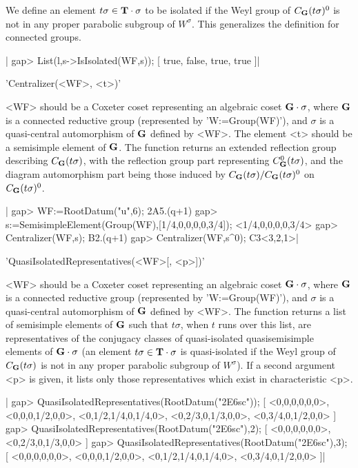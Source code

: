 We  define an element $t\sigma\in{\bf T}\cdot\sigma$ to be isolated if the Weyl
group  of $C_{\bf G}(t\sigma)^0$  is not  in any  proper parabolic  subgroup of
$W^\sigma$. This generalizes the definition for connected groups.

|    gap> List(l,s->IsIsolated(WF,s));
    [ true, false, true, true ]|


'Centralizer(<WF>, <t>)'

<WF>   should  be   a  Coxeter   coset  representing   an  algebraic  coset
${\bf G}\cdot\sigma$,  where ${\bf G}$ is a  connected reductive group (represented
by  'W:=Group(WF)'), and $\sigma$ is a quasi-central automorphism of ${\bf G}$
defined  by <WF>. The element <t> should  be a semisimple element of ${\bf G}$.
The    function   returns   an   extended   reflection   group   describing
$C_{\bf G}(t\sigma)$,    with   the   reflection    group   part   representing
$C_{\bf G}^0(t\sigma)$,  and the diagram automorphism  part being those induced
by $C_{\bf G}(t\sigma)/C_{\bf G}(t\sigma)^0$ on $C_{\bf G}(t\sigma)^0$.

|    gap> WF:=RootDatum("u",6);
    2A5.(q+1)
    gap> s:=SemisimpleElement(Group(WF),[1/4,0,0,0,0,3/4]);
    <1/4,0,0,0,0,3/4>
    gap> Centralizer(WF,s);
    B2.(q+1)
    gap> Centralizer(WF,s^0);
    C3<3,2,1>|

'QuasiIsolatedRepresentatives(<WF>[, <p>])'

<WF>   should  be   a  Coxeter   coset  representing   an  algebraic  coset
${\bf G}\cdot\sigma$,  where ${\bf G}$ is a  connected reductive group (represented
by  'W:=Group(WF)'), and $\sigma$ is  a quasi-central automorphism of ${\bf G}$
defined  by <WF>.  The function  returns a  list of  semisimple elements of
${\bf G}$   such  that   $t\sigma$,  when   $t$  runs   over  this   list,  are
representatives  of the conjugacy classes of quasi-isolated quasisemisimple
elements  of  ${\bf G}\cdot\sigma$  (an  element  $t\sigma\in{\bf T}\cdot\sigma$ is
quasi-isolated  if the Weyl group of  $C_{\bf G}(t\sigma)$ is not in any proper
parabolic  subgroup of $W^\sigma$).  If a second  argument <p> is given, it
lists only those representatives which exist in characteristic <p>.

|    gap> QuasiIsolatedRepresentatives(RootDatum("2E6sc"));
    [ <0,0,0,0,0,0>, <0,0,0,1/2,0,0>, <0,1/2,1/4,0,1/4,0>,
      <0,2/3,0,1/3,0,0>, <0,3/4,0,1/2,0,0> ]
    gap> QuasiIsolatedRepresentatives(RootDatum("2E6sc"),2);
    [ <0,0,0,0,0,0>, <0,2/3,0,1/3,0,0> ]
    gap> QuasiIsolatedRepresentatives(RootDatum("2E6sc"),3);
    [ <0,0,0,0,0,0>, <0,0,0,1/2,0,0>, <0,1/2,1/4,0,1/4,0>,
      <0,3/4,0,1/2,0,0> ]|

